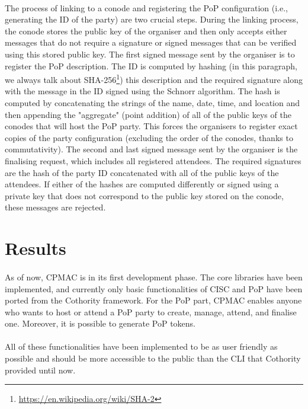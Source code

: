 \paragraph{}
The process of linking to a conode and registering the PoP configuration (i.e., generating the ID of the party) are two crucial steps. During the linking process, the conode stores the public key of the organiser and then only accepts either messages that do not require a signature or signed messages that can be verified using this stored public key. The first signed message sent by the organiser is to register the PoP description. The ID is computed by hashing (in this paragraph, we always talk about SHA-256\footnote{\url{https://en.wikipedia.org/wiki/SHA-2}}) this description and the required signature along with the message in the ID signed using the Schnorr algorithm. The hash is computed by concatenating the strings of the name, date, time, and location and then appending the "aggregate" (point addition) of all of the public keys of the conodes that will host the PoP party. This forces the organisers to register exact copies of the party configuration (excluding the order of the conodes, thanks to commutativity). The second and last signed message sent by the organiser is the finalising request, which includes all registered attendees. The required signatures are the hash of the party ID concatenated with all of the public keys of the attendees. If either of the hashes are computed differently or signed using a private key that does not correspond to the public key stored on the conode, these messages are rejected.

\section{Results}

\paragraph{}
As of now, CPMAC is in its first development phase. The core libraries have been implemented, and currently only basic functionalities of CISC and PoP have been ported from the Cothority framework. For the PoP part, CPMAC enables anyone who wants to host or attend a PoP party to create, manage, attend, and finalise one. Moreover, it is possible to generate PoP tokens.

\paragraph{}
All of these functionalities have been implemented to be as user friendly as possible and should be more accessible to the public than the CLI that Cothority provided until now.

